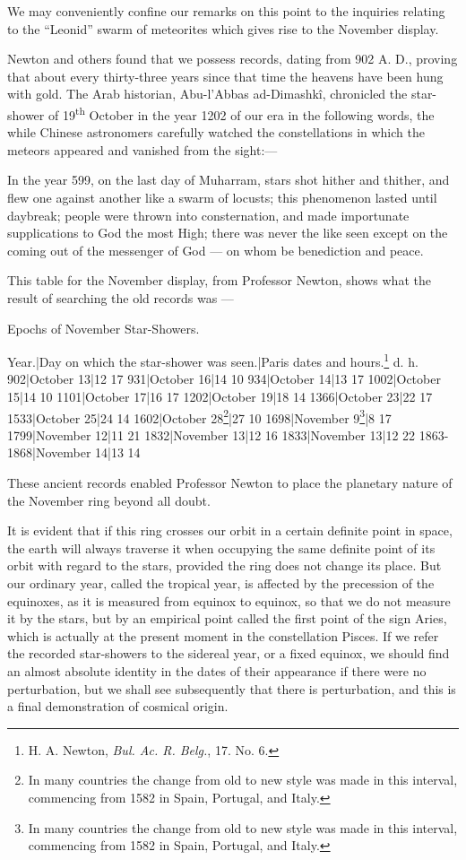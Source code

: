 \documentclass[a4paper, 12pt, oneside, polutonikogreek, english]{article}
\begin{document}
We may conveniently confine our remarks on this point to the inquiries relating to the ``Leonid'' swarm of meteorites which gives rise to the November display.

Newton and others found that we possess records, dating from 902 A. D., proving that about every thirty-three years since that time the heavens have been hung with gold. The Arab historian, Abu-l'Abbas ad-Dimashkî, chronicled the star-shower of 19\textsuperscript{th} October in the year 1202 of our era in the following words, the while Chinese astronomers carefully watched the constellations in which the meteors appeared and vanished from the sight:---

In the year 599, on the last day of Muharram, stars shot hither and thither, and flew one against another like a swarm of locusts; this phenomenon lasted until daybreak; people were thrown into consternation, and made importunate supplications to God the most High; there was never the like seen except on the coming out of the messenger of God --- on whom be benediction and peace.

This table for the November display, from Professor Newton, shows what the result of searching the old records was ---

Epochs of November Star-Showers.

Year.|Day on which the star-shower was seen.|Paris dates and hours.\footnote{H. A. Newton, \emph{Bul. Ac. R. Belg.}, 17. No. 6.} d. h. 
902|October 13|12 17 
931|October 16|14 10 
934|October 14|13 17 
1002|October 15|14 10 
1101|October 17|16 17 
1202|October 19|18 14 
1366|October 23|22 17 
1533|October 25|24 14 
1602|October 28\footnote{In many countries the change from old to new style was made in this interval, commencing from 1582 in Spain, Portugal, and Italy.}|27 10 
1698|November 9\footnote{In many countries the change from old to new style was made in this interval, commencing from 1582 in Spain, Portugal, and Italy.}|8 17 
1799|November 12|11 21 
1832|November 13|12 16 
1833|November 13|12 22 
1863-1868|November 14|13 14 

These ancient records enabled Professor Newton to place the planetary nature of the November ring beyond all doubt.

It is evident that if this ring crosses our orbit in a certain definite point in space, the earth will always traverse it when occupying the same definite point of its orbit with regard to the stars, provided the ring does not change its place. But our ordinary year, called the tropical year, is affected by the precession of the equinoxes, as it is measured from equinox to equinox, so that we do not measure it by the stars, but by an empirical point called the first point of the sign Aries, which is actually at the present moment in the constellation Pisces. If we refer the recorded star-showers to the sidereal year, or a fixed equinox, we should find an almost absolute identity in the dates of their appearance if there were no perturbation, but we shall see subsequently that there is perturbation, and this is a final demonstration of cosmical origin.
\end{document}
